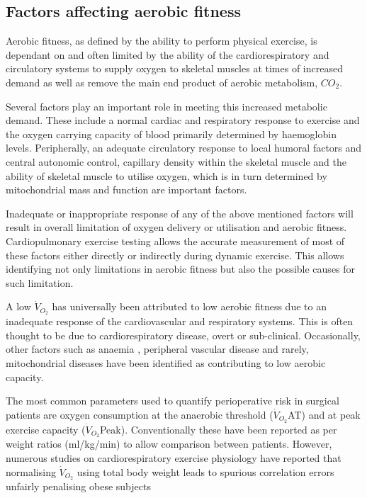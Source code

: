 \subsection{Factors affecting aerobic fitness}
Aerobic fitness, as defined by the ability to perform physical exercise, is dependant on and often limited by the ability of the cardiorespiratory and circulatory systems to supply oxygen to skeletal muscles at times of increased demand as well as remove the main end product of aerobic metabolism, $CO_2$. 

Several factors play an important role in meeting this increased metabolic demand. 
These include a normal cardiac and respiratory response to exercise and the oxygen carrying capacity of blood primarily determined by haemoglobin levels. 
Peripherally, an adequate circulatory response to local humoral factors and central autonomic control, capillary density within the skeletal muscle and the ability of skeletal muscle to utilise oxygen, which is in turn determined by mitochondrial mass and function are important factors.

Inadequate or inappropriate response of any of the above mentioned factors will result in overall limitation of oxygen delivery or utilisation and aerobic fitness. 
Cardiopulmonary exercise testing allows the accurate measurement of most of these factors either directly or indirectly during dynamic exercise.
This allows identifying not only limitations in aerobic fitness but also the possible causes for such limitation. 

A low $\dot{V}_{O_2}$ has universally been attributed to low aerobic fitness due to an inadequate response of the cardiovascular and respiratory systems. 
This is often thought to be due to cardiorespiratory disease, overt or sub-clinical. 
Occasionally, other factors such as anaemia \parencite{agostoni_relationship_2010}, peripheral vascular disease and rarely, mitochondrial diseases \parencite{fernandez_use_2000} have been identified as contributing to low aerobic capacity.

The most common parameters used to quantify perioperative risk in surgical patients are oxygen consumption at the anaerobic threshold ($\dot{V}_{O_2}$AT) and at peak exercise capacity ($\dot{V}_{O_2}$Peak). 
Conventionally these have been reported as per weight ratios (ml/kg/min) to allow comparison between patients. 
However, numerous studies on cardiorespiratory exercise physiology have reported that normalising $\dot{V}_{O_2}$ using total body weight leads to spurious correlation errors unfairly penalising obese subjects \parencite{seltzer_body_1940, tanner_fallacy_1949, toth_examination_1993, batterham_modeling_1999, goran_total_2000, krachler_cardiopulmonary_2014} 

